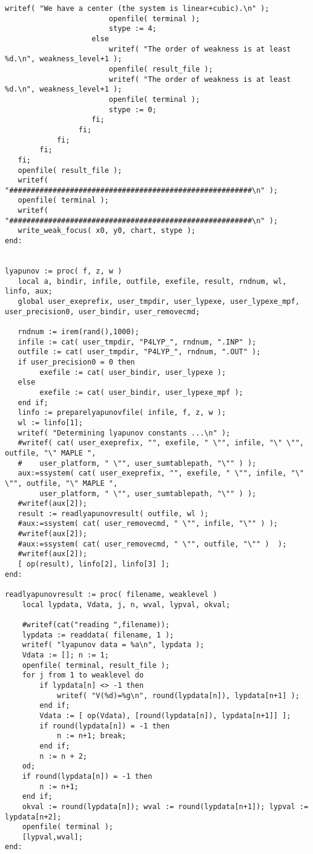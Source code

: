 \documentclass[a4paper,10pt]{article}
\begin{document}
\begin{lstlisting}[name=weakfocus]
                        writef( "We have a center (the system is linear+cubic).\n" );
                        openfile( terminal );
                        stype := 4;
                    else
                        writef( "The order of weakness is at least %d.\n", weakness_level+1 );
                        openfile( result_file );
                        writef( "The order of weakness is at least %d.\n", weakness_level+1 );
                        openfile( terminal );
                        stype := 0;
                    fi;
                 fi;
            fi;
        fi;
   fi;
   openfile( result_file );
   writef( "########################################################\n" );
   openfile( terminal );
   writef( "########################################################\n" );
   write_weak_focus( x0, y0, chart, stype );
end:


lyapunov := proc( f, z, w )
   local a, bindir, infile, outfile, exefile, result, rndnum, wl, linfo, aux;
   global user_exeprefix, user_tmpdir, user_lypexe, user_lypexe_mpf, user_precision0, user_bindir, user_removecmd;

   rndnum := irem(rand(),1000);
   infile := cat( user_tmpdir, "P4LYP_", rndnum, ".INP" );
   outfile := cat( user_tmpdir, "P4LYP_", rndnum, ".OUT" );
   if user_precision0 = 0 then
        exefile := cat( user_bindir, user_lypexe );
   else
        exefile := cat( user_bindir, user_lypexe_mpf );
   end if;
   linfo := preparelyapunovfile( infile, f, z, w );
   wl := linfo[1];
   writef( "Determining lyapunov constants ...\n" );
   #writef( cat( user_exeprefix, "", exefile, " \"", infile, "\" \"", outfile, "\" MAPLE ",
   #    user_platform, " \"", user_sumtablepath, "\"" ) );
   aux:=ssystem( cat( user_exeprefix, "", exefile, " \"", infile, "\" \"", outfile, "\" MAPLE ",
        user_platform, " \"", user_sumtablepath, "\"" ) );
   #writef(aux[2]);
   result := readlyapunovresult( outfile, wl );
   #aux:=ssystem( cat( user_removecmd, " \"", infile, "\"" ) );
   #writef(aux[2]);
   #aux:=ssystem( cat( user_removecmd, " \"", outfile, "\"" )  );
   #writef(aux[2]);
   [ op(result), linfo[2], linfo[3] ];
end:

readlyapunovresult := proc( filename, weaklevel )
    local lypdata, Vdata, j, n, wval, lypval, okval;

    #writef(cat("reading ",filename));
    lypdata := readdata( filename, 1 );
    writef( "lyapunov data = %a\n", lypdata );
    Vdata := []; n := 1;
    openfile( terminal, result_file );
    for j from 1 to weaklevel do
        if lypdata[n] <> -1 then
            writef( "V(%d)=%g\n", round(lypdata[n]), lypdata[n+1] );
        end if;
        Vdata := [ op(Vdata), [round(lypdata[n]), lypdata[n+1]] ];
        if round(lypdata[n]) = -1 then
            n := n+1; break;
        end if;
        n := n + 2;
    od;
    if round(lypdata[n]) = -1 then
        n := n+1;
    end if;
    okval := round(lypdata[n]); wval := round(lypdata[n+1]); lypval := lypdata[n+2];
    openfile( terminal );
    [lypval,wval];
end:


\end{lstlisting}
\end{document}
